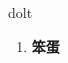 
\begin{frame}
{\huge dolt}
\begin{center}
\begin{enumerate}\Large
  \item \textbf{笨蛋}
\end{enumerate}
\end{center}
\end{frame}
